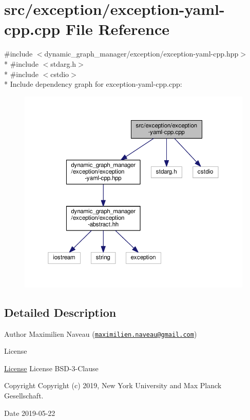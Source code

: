 \hypertarget{exception-yaml-cpp_8cpp}{}\section{src/exception/exception-\/yaml-\/cpp.cpp File Reference}
\label{exception-yaml-cpp_8cpp}
{\ttfamily \#include $<$dynamic\+\_\+graph\+\_\+manager/exception/exception-\/yaml-\/cpp.\+hpp$>$}\\*
{\ttfamily \#include $<$stdarg.\+h$>$}\\*
{\ttfamily \#include $<$cstdio$>$}\\*
Include dependency graph for exception-\/yaml-\/cpp.cpp\+:
\nopagebreak
\begin{figure}[H]
\begin{center}
\leavevmode
\includegraphics[width=350pt]{exception-yaml-cpp_8cpp__incl}
\end{center}
\end{figure}


\subsection{Detailed Description}
\begin{DoxyAuthor}{Author}
Maximilien Naveau (\href{mailto:maximilien.naveau@gmail.com}{\tt maximilien.\+naveau@gmail.\+com}) 
\end{DoxyAuthor}
\begin{DoxyRefDesc}{License}
\item[\hyperlink{license__license000053}{License}]License B\+S\+D-\/3-\/\+Clause \end{DoxyRefDesc}
\begin{DoxyCopyright}{Copyright}
Copyright (c) 2019, New York University and Max Planck Gesellschaft. 
\end{DoxyCopyright}
\begin{DoxyDate}{Date}
2019-\/05-\/22 
\end{DoxyDate}
